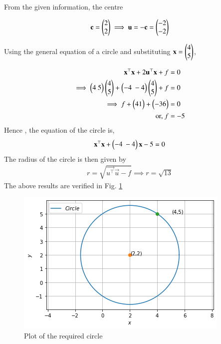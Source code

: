 From the given information, the centre 

\begin{align}
    \mathbf{c} = \begin{pmatrix}2\\2\end{pmatrix} \implies   \mathbf {u}= -\mathbf{c} = \begin{pmatrix}-2\\-2 \end{pmatrix}
\end{align}

Using the general equation of a circle and substituting $\mathbf{x} = \begin{pmatrix}4\\5\end{pmatrix}$,

\begin{align}
    \label{quadforms/july/2/2/eq:1}
    \begin{split}
\vec{x^\top}\vec{x}+2\vec{u^\top}\vec{x}+f&=0 
\\
\implies     \myvec{4 \ 5}\myvec{4\\5}+\myvec{-4 \ -4}\myvec{4\\5}+f&=0
\\
\implies f+\myvec{41}+\myvec{-36} &= 0 
\\
\text{or, }  f &= -5
    \end{split}
\end{align}
%
Hence , the equation of the circle is,
\begin{align}
    \mathbf{x^\top}\mathbf{x}+\begin{pmatrix}-4 \ -4 \end{pmatrix}\mathbf{x}-5=0
\end{align}
%
The radius of the circle is then given by 
\begin{align}
r = \sqrt{\vec{u^\top}\vec{u}-f}
\implies r = \sqrt{13}
\end{align}
%
The above results are verified in Fig.     \ref{quadforms/july/2/2/Figure}


\begin{figure}[!h]
    \centering
    \includegraphics[width=\columnwidth]{solutions/july/2/2/Figures/Figure.png}
    \caption{Plot of the required circle}
    \label{quadforms/july/2/2/Figure}
\end{figure}
